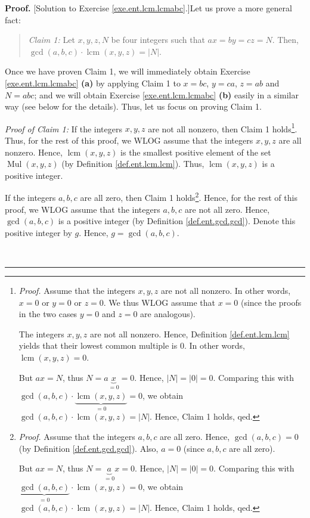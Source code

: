 \documentclass[numbers=enddot,12pt,final,onecolumn,notitlepage]{scrartcl}%
\numberwithin{exer}{subsection}
\theoremstyle{definition}
\newenvironment{statement}{\begin{quote}}{\end{quote}}
\newenvironment{fineprint}{\begin{small}}{\end{small}}
\newenvironment{proof}[1][Proof]{\noindent\textbf{#1.} }{\ \rule{0.5em}{0.5em}}
\begin{document}
\begin{fineprint}
\begin{proof}
[Solution to Exercise \ref{exe.ent.lcm.lcmabc}.]Let us prove a more general fact:

\begin{statement}
\textit{Claim 1:} Let $x,y,z,N$ be four integers such that $ax=by=cz=N$. Then,
$\gcd\left(  a,b,c\right)  \cdot\operatorname{lcm}\left(  x,y,z\right)
=\left\vert N\right\vert $.
\end{statement}

Once we have proven Claim 1, we will immediately obtain Exercise
\ref{exe.ent.lcm.lcmabc} \textbf{(a)} by applying Claim 1 to $x=bc$, $y=ca$,
$z=ab$ and $N=abc$; and we will obtain Exercise \ref{exe.ent.lcm.lcmabc}
\textbf{(b)} easily in a similar way (see below for the details). Thus, let us
focus on proving Claim 1.

\textit{Proof of Claim 1:} If the integers $x,y,z$ are not all nonzero, then
Claim 1 holds\footnote{\textit{Proof.} Assume that the integers $x,y,z$ are
not all nonzero. In other words, $x=0$ or $y=0$ or $z=0$. We thus WLOG assume
that $x=0$ (since the proofs in the two cases $y=0$ and $z=0$ are analogous).
\par
The integers $x,y,z$ are not all nonzero. Hence, Definition
\ref{def.ent.lcm.lcm} yields that their lowest common multiple is $0$. In
other words, $\operatorname{lcm}\left(  x,y,z\right)  =0$.
\par
But $ax=N$, thus $N=a\underbrace{x}_{=0}=0$. Hence, $\left\vert N\right\vert
=\left\vert 0\right\vert =0$. Comparing this with $\gcd\left(  a,b,c\right)
\cdot\underbrace{\operatorname{lcm}\left(  x,y,z\right)  }_{=0}=0$, we obtain
$\gcd\left(  a,b,c\right)  \cdot\operatorname{lcm}\left(  x,y,z\right)
=\left\vert N\right\vert $. Hence, Claim 1 holds, qed.}. Thus, for the rest of
this proof, we WLOG assume that the integers $x,y,z$ are all nonzero. Hence,
$\operatorname{lcm}\left(  x,y,z\right)  $ is the smallest positive element of
the set $\operatorname*{Mul}\left(  x,y,z\right)  $ (by Definition
\ref{def.ent.lcm.lcm}). Thus, $\operatorname{lcm}\left(  x,y,z\right)  $ is a
positive integer.

If the integers $a,b,c$ are all zero, then Claim 1
holds\footnote{\textit{Proof.} Assume that the integers $a,b,c$ are all zero.
Hence, $\gcd\left(  a,b,c\right)  =0$ (by Definition \ref{def.ent.gcd.gcd}).
Also, $a=0$ (since $a,b,c$ are all zero).
\par
But $ax=N$, thus $N=\underbrace{a}_{=0}x=0$. Hence, $\left\vert N\right\vert
=\left\vert 0\right\vert =0$. Comparing this with $\underbrace{\gcd\left(
a,b,c\right)  }_{=0}\cdot\operatorname{lcm}\left(  x,y,z\right)  =0$, we
obtain $\gcd\left(  a,b,c\right)  \cdot\operatorname{lcm}\left(  x,y,z\right)
=\left\vert N\right\vert $. Hence, Claim 1 holds, qed.}. Hence, for the rest
of this proof, we WLOG assume that the integers $a,b,c$ are not all zero.
Hence, $\gcd\left(  a,b,c\right)  $ is a positive integer (by Definition
\ref{def.ent.gcd.gcd}). Denote this positive integer by $g$. Hence,
$g=\gcd\left(  a,b,c\right)  $.


\end{proof}
\end{fineprint}
\end{document}
